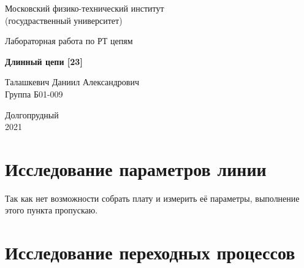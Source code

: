 \documentclass[a4paper, 14pt]{extarticle}%
\date{}
\begin{document}
\begin{titlepage}

	\newpage
	\begin{center}
		\normalsize Московский физико-технический институт \\(госудраственный 			университет)
	\end{center}

	\vspace{6em}

	\begin{center}
		\Large Лабораторная работа по РТ цепям\\
	\end{center}

	\vspace{1em}

	\begin{center}
		\large \textbf{Длинный цепи [23]}
	\end{center}

	\vspace{2em}

	\begin{center}
		\large Талашкевич Даниил Александрович\\
		Группа Б01-009
	\end{center}

	\vspace{\fill}

	\begin{center}
	Долгопрудный \\2021
	\end{center}
	
\end{titlepage}



	\thispagestyle{empty}
	\newpage
	\tableofcontents
	\newpage
	\setcounter{page}{1}


\section{Исследование параметров линии}

Так как нет возможности собрать плату и измерить её параметры, выполнение этого пункта пропускаю.

\section{Исследование переходных процессов}
\end{document}
